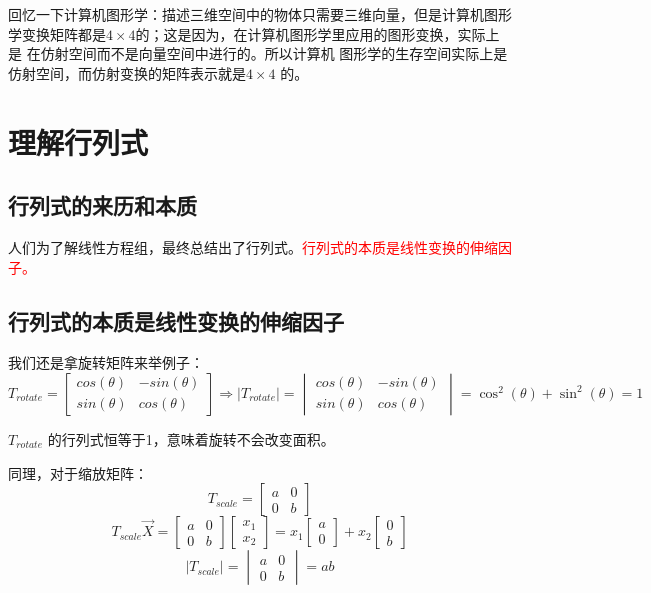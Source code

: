 \documentclass[12pt]{article}
\begin{document}
回忆一下计算机图形学：描述三维空间中的物体只需要三维向量，但是计算机图形学变换矩阵都是$4\times 4$的；这是因为，在计算机图形学里应用的图形变换，实际上是 在仿射空间而不是向量空间中进行的。所以计算机 图形学的生存空间实际上是仿射空间，而仿射变换的矩阵表示就是$4\times 4$ 的\cite{Fantastic_Matrix_1}。

\section{理解行列式\cite{How_To_Understand_Determinant}}
\subsection{行列式的来历和本质}
人们为了解线性方程组，最终总结出了行列式。\textcolor{red}{行列式的本质是线性变换的伸缩因子。}

\subsection{行列式的本质是线性变换的伸缩因子}
我们还是拿旋转矩阵来举例子：
$$
T_{rotate}=\begin{bmatrix}cos(\theta)&-sin(\theta)\\sin(\theta)&cos(\theta)\end{bmatrix} \Rightarrow |T_{rotate}| = \begin{vmatrix}cos(\theta)&-sin(\theta)\\sin(\theta)&cos(\theta)\end{vmatrix} = \cos^2(\theta) + \sin^2(\theta) = 1
$$

$T_{rotate}$ 的行列式恒等于1，意味着旋转不会改变面积。

同理，对于缩放矩阵：
$$
T_{scale} = \begin{bmatrix}a&0\\0&b\end{bmatrix}
$$
$$
T_{scale}\vec{X} = \begin{bmatrix}a&0\\0&b\end{bmatrix}
\begin{bmatrix}x_1\\x_2\end{bmatrix} = 
x_1\begin{bmatrix}a\\0\end{bmatrix} + 
x_2\begin{bmatrix}0\\b\end{bmatrix}
$$
$$
|T_{scale}| = \begin{vmatrix}a&0\\0&b\end{vmatrix} = ab
$$
\end{document}
